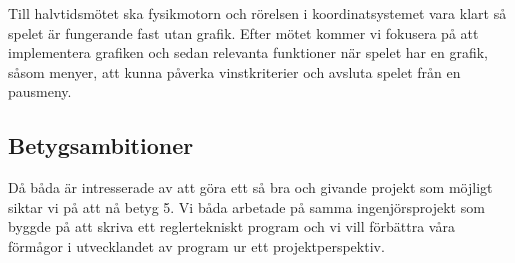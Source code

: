 \documentclass[12pt,a4paper]{article}
\begin{document}
Till halvtidsmötet ska fysikmotorn och rörelsen i koordinatsystemet vara klart så spelet är fungerande fast utan grafik. Efter mötet kommer vi fokusera på att implementera grafiken och sedan relevanta funktioner när spelet har en grafik, såsom menyer, att kunna påverka vinstkriterier och avsluta spelet från en pausmeny.

\subsection{Betygsambitioner}
Då båda är intresserade av att göra ett så bra och givande projekt som möjligt siktar vi på att nå betyg 5. Vi båda arbetade på samma ingenjörsprojekt som byggde på att skriva ett reglertekniskt program och vi vill förbättra våra förmågor i utvecklandet av program ur ett projektperspektiv. 
\end{document}
